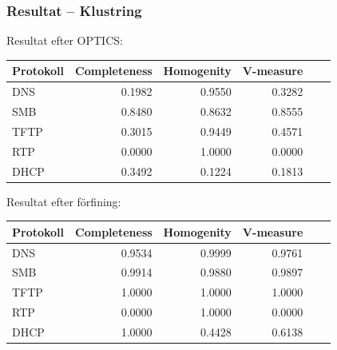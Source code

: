 \documentclass[xetex]{beamer}
\begin{document}
    \begin{frame}
        \frametitle{Resultat -- Klustring}
        Resultat efter OPTICS:
        \begin{table}[h]
            \centering
            \scriptsize{
                \begin{tabular}{| l | r | r | r | r | r |}
                    \hline
                    \textbf{Protokoll}&\textbf{Completeness}&\textbf{Homogenity}&\textbf{V-measure} \\ \hline
                    DNS & 0.1982 & 0.9550 & 0.3282 \\ \hline
                    SMB & 0.8480 & 0.8632 & 0.8555 \\ \hline
                    TFTP & 0.3015 & 0.9449 & 0.4571 \\ \hline
                    RTP & 0.0000 & 1.0000 & 0.0000 \\ \hline
                    DHCP & 0.3492 & 0.1224 & 0.1813 \\ \hline
                \end{tabular}
            }
        \end{table}
        Resultat efter förfining:
        \begin{table}[h]
            \centering
            \scriptsize{
                \begin{tabular}{| l | r | r | r | r | r |}
                    \hline
                    \textbf{Protokoll}&\textbf{Completeness}&\textbf{Homogenity}&\textbf{V-measure} \\ \hline
                    DNS & 0.9534 & 0.9999 & 0.9761 \\ \hline
                    SMB & 0.9914 & 0.9880 & 0.9897 \\ \hline
                    TFTP & 1.0000 & 1.0000 & 1.0000 \\ \hline
                    RTP & 0.0000 & 1.0000 & 0.0000 \\ \hline
                    DHCP & 1.0000 & 0.4428 & 0.6138 \\ \hline
                \end{tabular}
            }
        \end{table}
    \end{frame}
\end{document}

